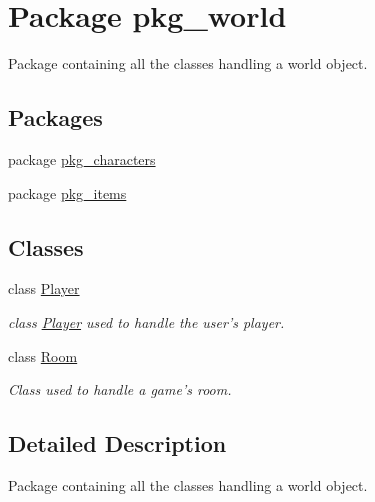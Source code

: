 \hypertarget{namespacepkg__world}{\section{Package pkg\-\_\-world}
\label{namespacepkg__world}
}


Package containing all the classes handling a world object.  


\subsection*{Packages}
\begin{DoxyCompactItemize}
\item 
package \hyperlink{namespacepkg__world_1_1pkg__characters}{pkg\-\_\-characters}
\item 
package \hyperlink{namespacepkg__world_1_1pkg__items}{pkg\-\_\-items}
\end{DoxyCompactItemize}
\subsection*{Classes}
\begin{DoxyCompactItemize}
\item 
class \hyperlink{classpkg__world_1_1Player}{Player}
\begin{DoxyCompactList}\small\item\em class \hyperlink{classpkg__world_1_1Player}{Player} used to handle the user's player. \end{DoxyCompactList}\item 
class \hyperlink{classpkg__world_1_1Room}{Room}
\begin{DoxyCompactList}\small\item\em Class used to handle a game's room. \end{DoxyCompactList}\end{DoxyCompactItemize}


\subsection{Detailed Description}
Package containing all the classes handling a world object. 